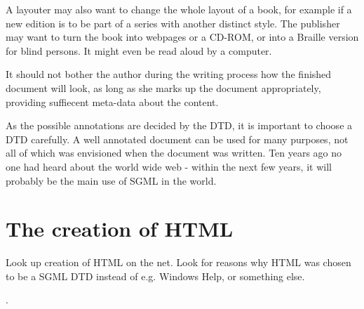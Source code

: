 A layouter may also want to change the whole layout of a book, for
example if a new edition is to be part of a series with another
distinct style.  The publisher may want to turn the book into webpages
or a CD-ROM, or into a Braille version for blind persons.  It might
even be read aloud by a computer.

It should not bother the author during the writing process how the
finished document will look, as long as she marks up the document
appropriately, providing suffiecent meta-data about the content.

As the possible annotations are decided by the DTD, it is important to
choose a DTD carefully.  A well annotated document can be used for
many purposes, not all of which was envisioned when the document was
written.  Ten years ago no one had heard about the world wide web -
within the next few years, it will probably be the main use of SGML in
the world.








\section{The \textsf{creation} of HTML}

\textsf{Look up creation of HTML on the net.  Look for reasons why HTML
  was chosen to be a SGML DTD instead of e.g. Windows Help, or
  something else}.

.



